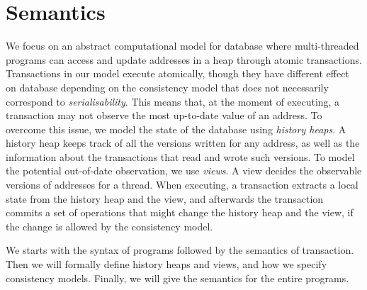 \section{Semantics\label{sec:semantics}}

We focus on an abstract computational model for database where multi-threaded programs can access and update addresses in a heap through atomic transactions. 
Transactions in our model execute atomically, though they have different effect on database depending on the consistency model that does not necessarily correspond to \emph{serialisability}. 
This means that, at the moment of executing, a transaction may not observe the most up-to-date value of an address. 
To overcome this issue, we model the state of the database using \emph{history heaps}. 
A history heap keeps track of all the versions written for any address, as well as the information about the transactions that read and wrote such versions. 
To model the potential out-of-date observation, we use \emph{views}.
A view decides the observable versions of addresses for a thread.
When executing, a transaction extracts a local state from the history heap and the view, and afterwards the transaction commits a set of operations that might change the history heap and the view, if the change is allowed by the consistency model.

We starts with the syntax of programs followed by the semantics of transaction.
Then we will formally define history heaps and views, and how we specify consistency models.
Finally, we will give the semantics for the entire programs.



%

